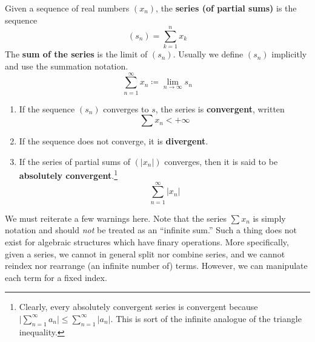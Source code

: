   \begin{definition}
    Given a sequence of real numbers $(x_n)$, the \textbf{series (of partial sums)} is the sequence 
    \begin{equation}
      (s_n) = \sum_{k=1}^n x_k
    \end{equation}
    The \textbf{sum of the series} is the limit of $(s_n)$. Usually we define $(s_n)$ implicitly and use the summation notation. 
    \begin{equation}
      \sum_{n=1}^\infty x_n \coloneqq \lim_{n \rightarrow \infty} s_n
    \end{equation}
    \begin{enumerate}
      \item If the sequence $(s_n)$ converges to $s$, the series is \textbf{convergent}, written 
      \begin{equation}
        \sum x_n < +\infty
      \end{equation}
      \item If the sequence does not converge, it is \textbf{divergent}. 
      \item If the series of partial sums of $(|x_n|)$ converges, then it is said to be \textbf{absolutely convergent}.\footnote{Clearly, every absolutely convergent series is convergent because $\big|\sum_{n=1}^\infty a_n \big| \leq \sum_{n=1}^\infty |a_n|$. This is sort of the infinite analogue of the triangle inequality.}
      \begin{equation}
        \sum_{n=1}^\infty |x_n|
      \end{equation}
    \end{enumerate}
  \end{definition}

  We must reiterate a few warnings here. Note that the series $\sum x_n$ is simply notation and should \textit{not} be treated as an ``infinite sum.'' Such a thing does not exist for algebraic structures which have finary operations. More specifically, given a series, we cannot in general split nor combine series, and we cannot reindex nor rearrange (an infinite number of) terms. However, we can manipulate each term for a fixed index. 

